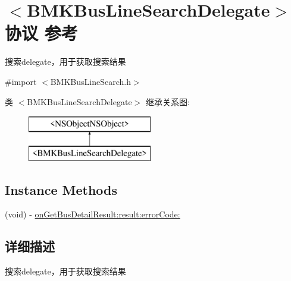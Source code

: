 \hypertarget{protocol_b_m_k_bus_line_search_delegate-p}{\section{$<$B\+M\+K\+Bus\+Line\+Search\+Delegate$>$协议 参考}
\label{protocol_b_m_k_bus_line_search_delegate-p}
}


搜索delegate，用于获取搜索结果  




{\ttfamily \#import $<$B\+M\+K\+Bus\+Line\+Search.\+h$>$}

类 $<$B\+M\+K\+Bus\+Line\+Search\+Delegate$>$ 继承关系图\+:\begin{figure}[H]
\begin{center}
\leavevmode
\includegraphics[height=2.000000cm]{protocol_b_m_k_bus_line_search_delegate-p}
\end{center}
\end{figure}
\subsection*{Instance Methods}
\begin{DoxyCompactItemize}
\item 
(void) -\/ \hyperlink{protocol_b_m_k_bus_line_search_delegate-p_ae1c5bce88d11150d38f8179368f39137}{on\+Get\+Bus\+Detail\+Result\+:result\+:error\+Code\+:}
\end{DoxyCompactItemize}


\subsection{详细描述}
搜索delegate，用于获取搜索结果 

